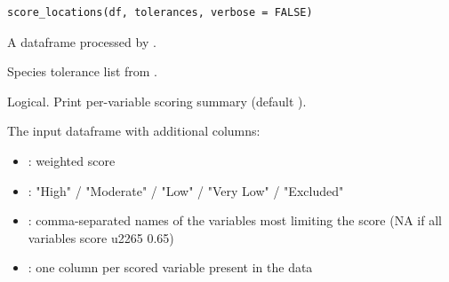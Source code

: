 \documentclass[a4paper]{book}
\begin{document}
%
\begin{Usage}
\begin{verbatim}
score_locations(df, tolerances, verbose = FALSE)
\end{verbatim}
\end{Usage}
%
\begin{Arguments}
\begin{ldescription}
\item[\code{df}] A dataframe processed by .

\item[\code{tolerances}] Species tolerance list from .

\item[\code{verbose}] Logical. Print per-variable scoring summary (default ).
\end{ldescription}
\end{Arguments}
%
\begin{Value}
The input dataframe with additional columns:
\begin{itemize}

\item{} : weighted score 
\item{} : "High" / "Moderate" / "Low" / "Very Low" / "Excluded"
\item{} : comma-separated names of the variables most limiting
the score (NA if all variables score \bsl{}u2265 0.65)
\item{} : one column per scored variable present in the data

\end{itemize}

\end{Value}
%
\end{document}
